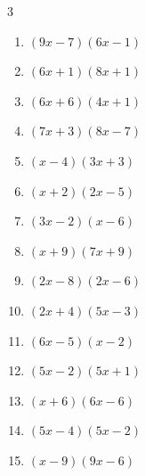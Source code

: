 \begin{multicols}{3}
\begin{enumerate}
  \item $(9x-7)(6x-1)$


  \item $(6x+1)(8x+1)$


  \item $(6x+6)(4x+1)$


  \item $(7x+3)(8x-7)$


  \item $(x-4)(3x+3)$


  \item $(x+2)(2x-5)$


  \item $(3x-2)(x-6)$


  \item $(x+9)(7x+9)$


\columnbreak %

  \item $(2x-8)(2x-6)$


  \item $(2x+4)(5x-3)$


  \item $(6x-5)(x-2)$


  \item $(5x-2)(5x+1)$


  \item $(x+6)(6x-6)$


  \item $(5x-4)(5x-2)$


  \item $(x-9)(9x-6)$


\end{enumerate}
\end{multicols}
